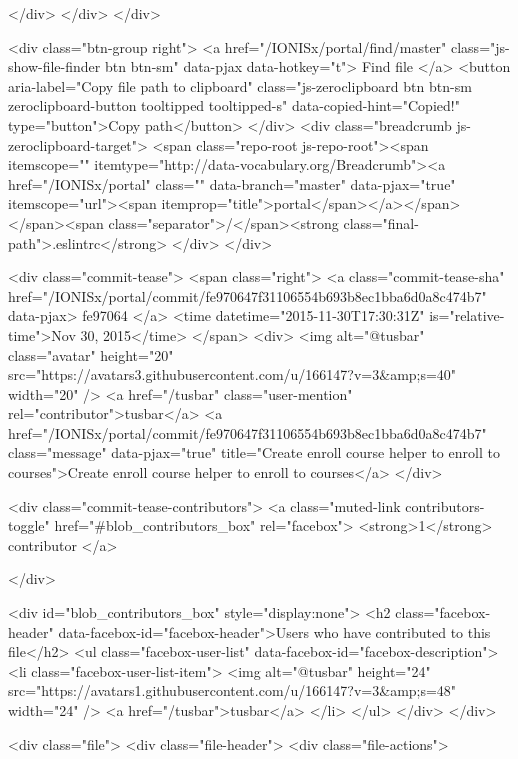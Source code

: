     </div>
  </div>
</div>

  <div class="btn-group right">
    <a href="/IONISx/portal/find/master"
          class="js-show-file-finder btn btn-sm"
          data-pjax
          data-hotkey="t">
      Find file
    </a>
    <button aria-label="Copy file path to clipboard" class="js-zeroclipboard btn btn-sm zeroclipboard-button tooltipped tooltipped-s" data-copied-hint="Copied!" type="button">Copy path</button>
  </div>
  <div class="breadcrumb js-zeroclipboard-target">
    <span class="repo-root js-repo-root"><span itemscope="" itemtype="http://data-vocabulary.org/Breadcrumb"><a href="/IONISx/portal" class="" data-branch="master" data-pjax="true" itemscope="url"><span itemprop="title">portal</span></a></span></span><span class="separator">/</span><strong class="final-path">.eslintrc</strong>
  </div>
</div>


  <div class="commit-tease">
      <span class="right">
        <a class="commit-tease-sha" href="/IONISx/portal/commit/fe970647f31106554b693b8ec1bba6d0a8c474b7" data-pjax>
          fe97064
        </a>
        <time datetime="2015-11-30T17:30:31Z" is="relative-time">Nov 30, 2015</time>
      </span>
      <div>
        <img alt="@tusbar" class="avatar" height="20" src="https://avatars3.githubusercontent.com/u/166147?v=3&amp;s=40" width="20" />
        <a href="/tusbar" class="user-mention" rel="contributor">tusbar</a>
          <a href="/IONISx/portal/commit/fe970647f31106554b693b8ec1bba6d0a8c474b7" class="message" data-pjax="true" title="Create enroll course helper to enroll to courses">Create enroll course helper to enroll to courses</a>
      </div>

    <div class="commit-tease-contributors">
      <a class="muted-link contributors-toggle" href="#blob_contributors_box" rel="facebox">
        <strong>1</strong>
         contributor
      </a>
      
    </div>

    <div id="blob_contributors_box" style="display:none">
      <h2 class="facebox-header" data-facebox-id="facebox-header">Users who have contributed to this file</h2>
      <ul class="facebox-user-list" data-facebox-id="facebox-description">
          <li class="facebox-user-list-item">
            <img alt="@tusbar" height="24" src="https://avatars1.githubusercontent.com/u/166147?v=3&amp;s=48" width="24" />
            <a href="/tusbar">tusbar</a>
          </li>
      </ul>
    </div>
  </div>

<div class="file">
  <div class="file-header">
  <div class="file-actions">


